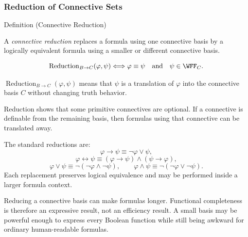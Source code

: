\subsubsection*{Reduction of Connective Sets}

\begin{definitionbox}{Definition (Connective Reduction)}
\begin{definition}
\label{def:connective-reduction-propositional-logic}
A \emph{connective reduction} replaces a formula using one connective basis by
a logically equivalent formula using a smaller or different connective basis.
\end{definition}
\end{definitionbox}

\begin{remark*}
\[
\operatorname{Reduction}_{B\to C}(\varphi,\psi)
\Longleftrightarrow
\varphi\equiv\psi
\quad\text{and}\quad
\psi\in\WFF_C.
\]
\end{remark*}

\begin{remark*}
\(\operatorname{Reduction}_{B\to C}(\varphi,\psi)\) means that \(\psi\) is a
translation of \(\varphi\) into the connective basis \(C\) without changing truth
behavior.
\end{remark*}

\begin{remark*}[Interpretation]
Reduction shows that some primitive connectives are optional. If a connective is
definable from the remaining basis, then formulas using that connective can be
translated away.
\end{remark*}

\begin{remark*}[Exposition]
The standard reductions are:
\[
\varphi\to\psi\equiv\neg\varphi\lor\psi,
\]
\[
\varphi\leftrightarrow\psi
\equiv
(\varphi\to\psi)\land(\psi\to\varphi),
\]
\[
\varphi\lor\psi\equiv\neg(\neg\varphi\land\neg\psi),
\qquad
\varphi\land\psi\equiv\neg(\neg\varphi\lor\neg\psi).
\]
Each replacement preserves logical equivalence and may be performed inside a
larger formula context.
\end{remark*}

\begin{remark*}[Exposition]
Reducing a connective basis can make formulas longer. Functional completeness is
therefore an expressive result, not an efficiency result. A small basis may be
powerful enough to express every Boolean function while still being awkward for
ordinary human-readable formulas.
\end{remark*}

